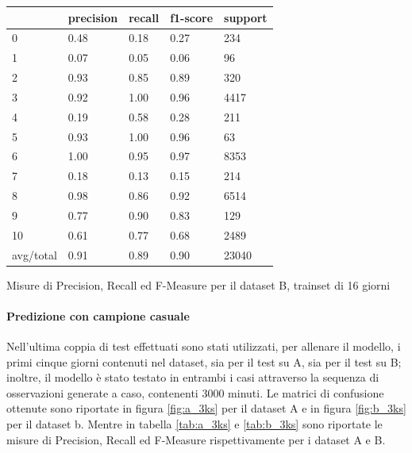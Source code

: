\documentclass[10pt,a4paper]{article}
\begin{document}
	\begin{table}[!htbp]
    \scriptsize
    \centering
    	\begin{tabularx}{0.56\textwidth}{l | llll}
    		{} & {precision} & {recall} & {f1-score} & {support} \\
    		\midrule
            {0} & {0.48} & {0.18} & {0.27} & {234} \\
            {1} & {0.07} & {0.05} & {0.06} & {96} \\
            {2} & {0.93} & {0.85} & {0.89} & {320} \\
            {3} & {0.92} & {1.00} & {0.96} & {4417} \\
            {4} & {0.19} & {0.58} & {0.28} & {211} \\
            {5} & {0.93} & {1.00} & {0.96} & {63} \\
            {6} & {1.00} & {0.95} & {0.97} & {8353} \\
            {7} & {0.18} & {0.13} & {0.15} & {214} \\
            {8} & {0.98} & {0.86} & {0.92} & {6514} \\
            {9} & {0.77} & {0.90} & {0.83} & {129} \\
            {10} & {0.61} & {0.77} & {0.68} & {2489} \\
            {avg/total} & {0.91} & {0.89} & {0.90} & {23040} \\
    	\end{tabularx}
    	 {Misure di Precision, Recall ed F-Measure per il dataset B, trainset di 16 giorni}
    	\label{tab:b_16d}
    \end{table}

	\paragraph{Predizione con campione casuale}

	Nell'ultima coppia di test effettuati sono stati utilizzati, per allenare il modello, i primi cinque giorni contenuti nel dataset, sia per il test su A, sia per il test su B; inoltre, il modello è stato testato in entrambi i casi attraverso la sequenza di osservazioni generate a caso, contenenti 3000 minuti. Le matrici di confusione ottenute sono riportate in figura \ref{fig:a_3ks} per il dataset A e in figura \ref{fig:b_3ks} per il dataset b. Mentre in tabella \ref{tab:a_3ks} e \ref{tab:b_3ks} sono riportate le misure di Precision, Recall ed F-Measure rispettivamente per i dataset A e B.
\end{document}
